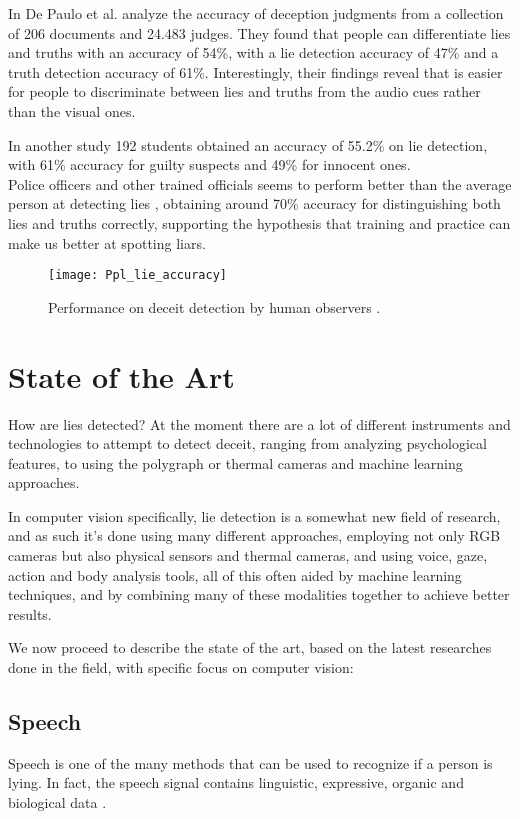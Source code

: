 In \cite{BondDePauloAccuracy} De Paulo et al. analyze the accuracy of deception judgments from a collection of 206 documents and 24.483 judges. They found that people can differentiate lies and truths with an accuracy of 54\%, with a lie detection accuracy of 47\% and a truth detection accuracy of 61\%. Interestingly, their findings reveal that is easier for people to discriminate between lies and truths from the audio cues rather than the visual ones.

In another study \cite{HartwigGranhag} 192 students obtained an accuracy of 55.2\% on lie detection, with 61\% accuracy for guilty suspects and 49\% for innocent ones.\\
Police officers and other trained officials seems to perform better than the average person at detecting lies  \cite{VrijPoliceDetect}, obtaining around 70\% accuracy for distinguishing both lies and truths correctly, supporting the hypothesis that training and practice can make us better at spotting liars.

\begin{figure}[H]
	\centering
	\texttt{[image: Ppl\_lie\_accuracy]}
	\caption{Performance on deceit detection by human observers \cite{SU201652}.}
\end{figure}
 
\clearpage

\section{State of the Art} \label{sota}
How are lies detected? At the moment there are a lot of different instruments and technologies to attempt to detect deceit, ranging from analyzing psychological features, to using the polygraph or thermal cameras and machine learning approaches.

In computer vision specifically, lie detection is a somewhat new field of research, and as such it's done using many different approaches, employing not only RGB cameras but also physical sensors and thermal cameras, and using voice, gaze, action and body analysis tools, all of this often aided by machine learning techniques, and by combining many of these modalities together to achieve better results.

We now proceed to describe the state of the art, based on the latest researches done in the field, with specific focus on computer vision:

\subsection{Speech}
Speech is one of the many methods that can be used to recognize if a person is lying. In fact, the speech signal contains linguistic, expressive, organic and biological data \cite{norena}.

